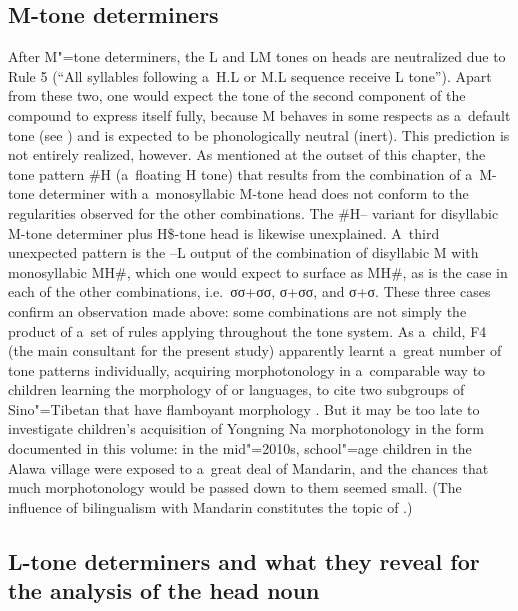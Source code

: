 \subsection{M-tone determiners}
\label{sec:Mtonedet}

After M"=tone determiners, the L and LM tones on heads are
neutralized due to Rule 5 (“All syllables following a~H.L or M.L sequence receive L tone”). Apart from these two, one would expect the tone of the second component of the compound to express itself
fully, because M behaves in some respects as a~default tone (see ) and is expected to be phonologically neutral (inert). This prediction is not entirely realized, however. As mentioned at the outset of this chapter, the tone pattern \#H (a~floating H tone) that results from the combination of a~M-tone determiner with a~monosyllabic M-tone
head does not conform to the regularities observed for the other combinations. The \#H--
variant for disyllabic M-tone determiner plus H\$-tone head is likewise unexplained. A~third
unexpected pattern is the --L output of the combination of disyllabic M with monosyllabic MH\#, which
one would expect to surface as MH\#, as is the case in each of the other combinations, i.e.\  σσ+σσ, σ+σσ, and σ+σ. These three cases confirm an observation made above: some combinations are not simply the product of a~set of rules applying
throughout the tone system. As a~child, F4 (the main consultant for the present study) apparently learnt a~great number of tone
patterns individually, acquiring morphotonology in a~comparable way to children learning the
morphology of  or  languages, to cite two subgroups of Sino"=Tibetan that have
flamboyant morphology \citep{michailovsky1975a,vandriem1990,sun2000a,jacques2004}. But it may be too late to investigate children's acquisition of Yongning Na morphotonology in the form documented in this volume: in the mid"=2010s, school"=age children in the Alawa village were exposed to a~great deal of {Mandarin}, and the chances that much morphotonology would be passed down to them seemed small. (The influence of {bilingualism} with {Mandarin} constitutes the topic of .)

\subsection[L-tone determiners]{L-tone determiners and what they reveal for the analysis of the head noun}

